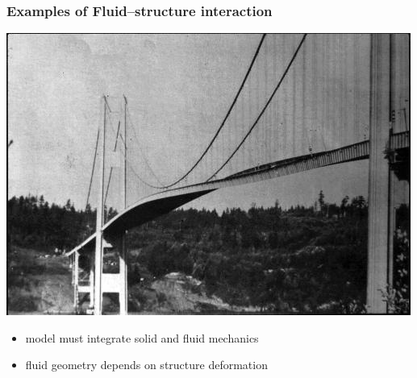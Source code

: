 \begin{frame}
  \frametitle{Examples of Fluid--structure interaction}

  \begin{center}
    \hspace{0.5cm}
   \includegraphics[height=0.4\textheight]{jpg/TacomaNarrows.jpg}
  \end{center}
  
  \begin{itemize}
  \item<2->model must integrate solid and fluid mechanics
   \item<3->fluid geometry depends on structure deformation
  \end{itemize}
\end{frame}
